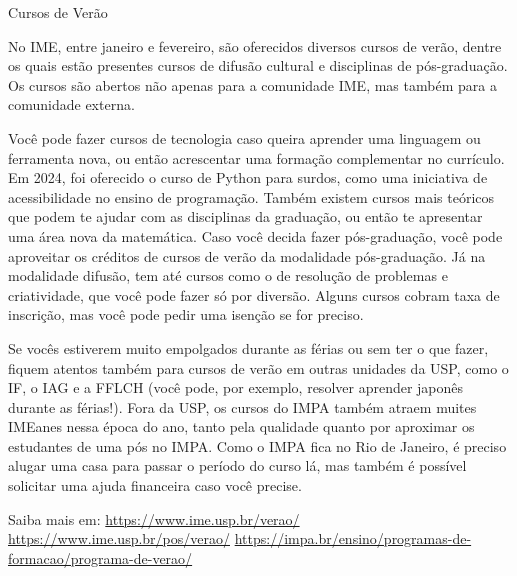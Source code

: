 \begin{secao}{Cursos de Verão}

No IME, entre janeiro e fevereiro, são oferecidos diversos cursos de verão,
dentre os quais estão presentes cursos de difusão cultural e disciplinas de
pós-graduação. Os cursos são abertos não apenas para a comunidade IME, mas
também para a comunidade externa.

Você pode fazer cursos de tecnologia caso queira aprender uma linguagem ou 
ferramenta nova, ou então acrescentar uma formação complementar no currículo. 
Em 2024, foi oferecido o curso de Python para surdos, como uma iniciativa de 
acessibilidade no ensino de programação. Também existem cursos mais teóricos que 
podem te ajudar com as disciplinas da graduação, ou então te apresentar uma área
nova da matemática. Caso você decida fazer pós-graduação, você pode aproveitar os 
créditos de cursos de verão da modalidade pós-graduação. Já na modalidade difusão, tem até cursos como
o de resolução de problemas e criatividade, que você pode fazer só por diversão. 
Alguns cursos cobram taxa de inscrição, mas você pode pedir uma isenção se for preciso. 

Se vocês estiverem muito empolgados durante as férias ou sem ter o que fazer, 
fiquem atentos também para cursos de verão em outras unidades da USP, como o IF, o IAG 
e a FFLCH (você pode, por exemplo, resolver aprender japonês durante as férias!). Fora da 
USP, os cursos do IMPA também atraem muites IMEanes nessa época do ano, tanto pela qualidade 
quanto por aproximar os estudantes de uma pós no IMPA. Como o IMPA fica no Rio de Janeiro, 
é preciso alugar uma casa para passar o período do curso lá, mas também é possível solicitar 
uma ajuda financeira caso você precise.


Saiba mais em: 
\url{https://www.ime.usp.br/verao/}
\url{https://www.ime.usp.br/pos/verao/}
\url{https://impa.br/ensino/programas-de-formacao/programa-de-verao/}

\end{secao}
